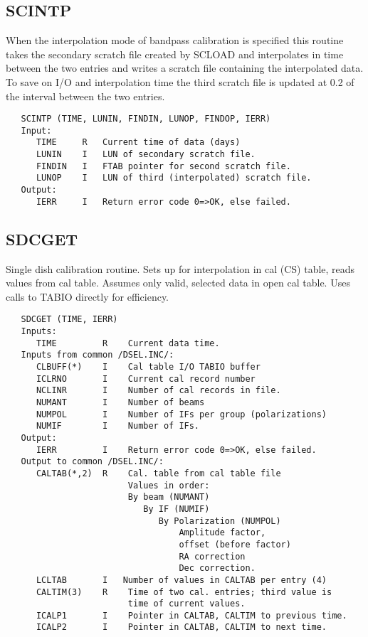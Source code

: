 \subsection{SCINTP}
When the interpolation mode of bandpass calibration is specified
this routine takes the secondary scratch file created by SCLOAD
and interpolates in time between the two entries and writes a
scratch file containing the interpolated data. To save on I/O
and interpolation time the third scratch file is updated at
0.2 of the interval between the two entries.
\begin{verbatim}
   SCINTP (TIME, LUNIN, FINDIN, LUNOP, FINDOP, IERR)
   Input:
      TIME     R   Current time of data (days)
      LUNIN    I   LUN of secondary scratch file.
      FINDIN   I   FTAB pointer for second scratch file.
      LUNOP    I   LUN of third (interpolated) scratch file.
   Output:
      IERR     I   Return error code 0=>OK, else failed.
\end{verbatim}

\subsection{SDCGET}
Single dish calibration routine.
Sets up for interpolation in cal (CS) table, reads values from cal
table.  Assumes only valid, selected data in open cal table.
Uses calls to TABIO directly for efficiency.
\begin{verbatim}
   SDCGET (TIME, IERR)
   Inputs:
      TIME         R    Current data time.
   Inputs from common /DSEL.INC/:
      CLBUFF(*)    I    Cal table I/O TABIO buffer
      ICLRNO       I    Current cal record number
      NCLINR       I    Number of cal records in file.
      NUMANT       I    Number of beams
      NUMPOL       I    Number of IFs per group (polarizations)
      NUMIF        I    Number of IFs.
   Output:
      IERR         I    Return error code 0=>OK, else failed.
   Output to common /DSEL.INC/:
      CALTAB(*,2)  R    Cal. table from cal table file
                        Values in order:
                        By beam (NUMANT)
                           By IF (NUMIF)
                              By Polarization (NUMPOL)
                                  Amplitude factor,
                                  offset (before factor)
                                  RA correction
                                  Dec correction.
      LCLTAB       I   Number of values in CALTAB per entry (4)
      CALTIM(3)    R    Time of two cal. entries; third value is
                        time of current values.
      ICALP1       I    Pointer in CALTAB, CALTIM to previous time.
      ICALP2       I    Pointer in CALTAB, CALTIM to next time.
\end{verbatim}

